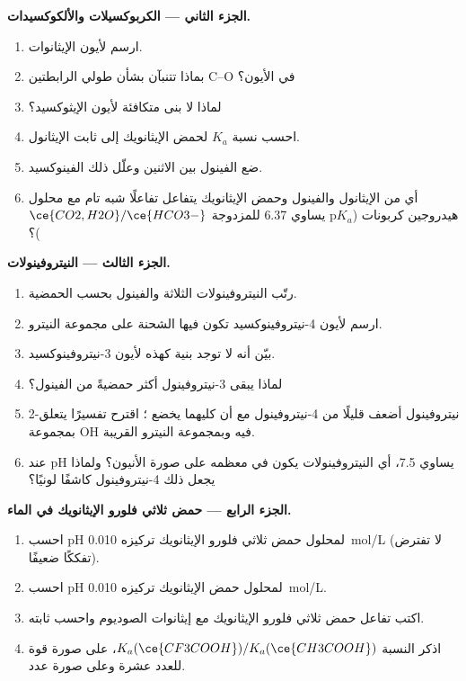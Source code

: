\begin{problem}
\medskip
\noindent\textbf{الجزء الثاني --- الكربوكسيلات والألكوكسيدات.}
\begin{enumerate}[resume]
  \item ارسم  لأيون الإيثانوات.
  \item بماذا تتنبآن بشأن طولي الرابطتين C--O في الأيون؟
  \item لماذا لا بنى متكافئة لأيون الإيثوكسيد؟
  \item احسب نسبة  $K_a$ لحمض الإيثانويك إلى ثابت الإيثانول.
  \item ضع الفينول بين الاثنين وعلّل ذلك 
        الفينوكسيد.
  \item أي من الإيثانول والفينول وحمض الإيثانويك يتفاعل تفاعلًا شبه تام
        مع محلول هيدروجين كربونات ($\mathrm{p}K_a$ يساوي 6.37 للمزدوجة
        $\ce{CO2,H2O}/\ce{HCO3-}$)؟
\end{enumerate}

\medskip
\noindent\textbf{الجزء الثالث --- النيتروفينولات.}
\begin{enumerate}[resume]
  \item رتّب النيتروفينولات الثلاثة والفينول بحسب الحمضية.
  \item ارسم  لأيون 4-نيتروفينوكسيد تكون فيها الشحنة على
        مجموعة النيترو.
  \item بيّن أنه لا توجد بنية كهذه لأيون 3-نيتروفينوكسيد.
  \item لماذا يبقى 3-نيتروفينول أكثر حمضيةً من الفينول؟
  \item 2-نيتروفينول أضعف قليلًا من 4-نيتروفينول مع أن كليهما
        يخضع ؛ اقترح تفسيرًا يتعلق بمجموعة
        OH فيه وبمجموعة النيترو القريبة.
  \item عند pH يساوي 7.5، أي النيتروفينولات يكون في معظمه على صورة الأنيون؟ ولماذا
        يجعل ذلك 4-نيتروفينول كاشفًا لونيًا؟
\end{enumerate}

\medskip
\noindent\textbf{الجزء الرابع --- حمض ثلاثي فلورو الإيثانويك في الماء.}
\begin{enumerate}[resume]
  \item احسب pH لمحلول حمض ثلاثي فلورو الإيثانويك تركيزه \qty{0.010}{mol/L}
        (لا تفترض تفككًا ضعيفًا).
  \item احسب pH لمحلول حمض الإيثانويك تركيزه \qty{0.010}{mol/L}.
  \item اكتب تفاعل حمض ثلاثي فلورو الإيثانويك مع إيثانوات الصوديوم
        واحسب ثابته.
  \item اذكر النسبة $K_a(\ce{CF3COOH})/K_a(\ce{CH3COOH})$، على صورة قوة
        للعدد عشرة وعلى صورة عدد.
\end{enumerate}
\end{problem}

